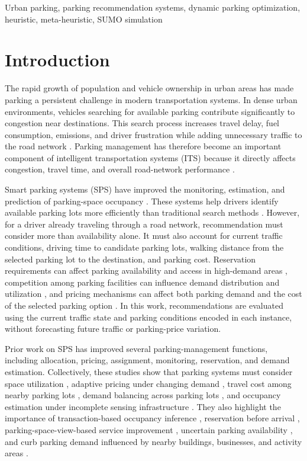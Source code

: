 \begin{IEEEkeywords}
Urban parking, parking recommendation systems, dynamic parking optimization, heuristic, meta-heuristic, SUMO simulation
\end{IEEEkeywords}

\section{Introduction}

The rapid growth of population and vehicle ownership in urban areas has made parking a persistent challenge in modern transportation systems. In dense urban environments, vehicles searching for available parking contribute significantly to congestion near destinations. This search process increases travel delay, fuel consumption, emissions, and driver frustration while adding unnecessary traffic to the road network \cite{ref1}. Parking management has therefore become an important component of intelligent transportation systems (ITS) because it directly affects congestion, travel time, and overall road-network performance \cite{ref2}.

Smart parking systems (SPS) have improved the monitoring, estimation, and prediction of parking-space occupancy \cite{ref3}. These systems help drivers identify available parking lots more efficiently than traditional search methods \cite{ref4}. However, for a driver already traveling through a road network, recommendation must consider more than availability alone. It must also account for current traffic conditions, driving time to candidate parking lots, walking distance from the selected parking lot to the destination, and parking cost. Reservation requirements can affect parking availability and access in high-demand areas \cite{ref5}, competition among parking facilities can influence demand distribution and utilization \cite{ref6}, and pricing mechanisms can affect both parking demand and the cost of the selected parking option \cite{ref7}. In this work, recommendations are evaluated using the current traffic state and parking conditions encoded in each instance, without forecasting future traffic or parking-price variation.

Prior work on SPS has improved several parking-management functions, including allocation, pricing, assignment, monitoring, reservation, and demand estimation. Collectively, these studies show that parking systems must consider space utilization \cite{ref8}, adaptive pricing under changing demand \cite{ref9}, travel cost among nearby parking lots \cite{ref10}, demand balancing across parking lots \cite{ref11}, and occupancy estimation under incomplete sensing infrastructure \cite{ref12}. They also highlight the importance of transaction-based occupancy inference \cite{ref13}, reservation before arrival \cite{ref14}, parking-space-view-based service improvement \cite{ref15}, uncertain parking availability \cite{ref16}, and curb parking demand influenced by nearby buildings, businesses, and activity areas \cite{ref17}.

